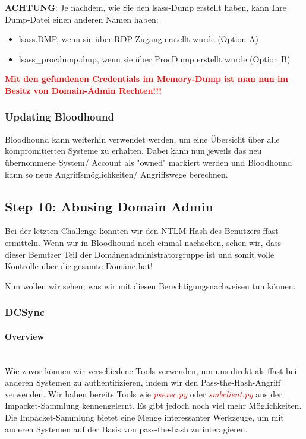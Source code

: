 \textbf{ACHTUNG}: Je nachdem, wie Sie den lsass-Dump erstellt haben, kann Ihre Dump-Datei einen anderen Namen haben:\\
\begin{itemize}
    \item lsass.DMP, wenn sie über RDP-Zugang erstellt wurde (Option A)
    \item lsass\_procdump.dmp, wenn sie über ProcDump erstellt wurde (Option B)\\
\end{itemize} 

\textcolor{red}{\textbf{Mit den gefundenen Credentials im Memory-Dump ist man nun im Besitz von Domain-Admin Rechten!!!}}

\subsubsection{Updating Bloodhound}
Bloodhound kann weiterhin verwendet werden, um eine Übersicht über alle kompromitierten Systeme zu erhalten. Dabei kann nun jeweils das neu übernommene System/ Account als "owned" markiert werden und Bloodhound kann so neue Angriffsmöglichkeiten/ Angriffswege berechnen.

\subsection{Step 10: Abusing Domain Admin}
Bei der letzten Challenge konnten wir den NTLM-Hash des Benutzers ffast ermitteln. Wenn wir in Bloodhound noch einmal nachsehen, sehen wir, dass dieser Benutzer Teil der Domänenadministratorgruppe ist und somit volle Kontrolle über die gesamte Domäne hat!

Nun wollen wir sehen, was wir mit diesen Berechtigungsnachweisen tun können.

\subsubsection{DCSync}

\paragraph{Overview}\mbox{} \\
Wie zuvor können wir verschiedene Tools verwenden, um uns direkt als ffast bei anderen Systemen zu authentifizieren, indem wir den Pass-the-Hash-Angriff verwenden. Wir haben bereits Tools wie \textcolor{red}{\textit{psexec.py}} oder \textcolor{red}{\textit{smbclient.py}} aus der Impacket-Sammlung kennengelernt.
Es gibt jedoch noch viel mehr Möglichkeiten. Die Impacket-Sammlung bietet eine Menge interessanter Werkzeuge, um mit anderen Systemen auf der Basis von pass-the-hash zu interagieren.

